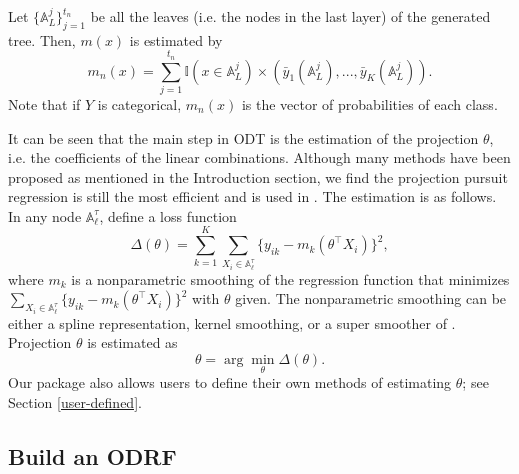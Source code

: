 Let $\{\mathbb{A}_L^j\}_{j=1}^{t_n}$ be all the leaves (i.e. the nodes in the last layer) of the generated tree. Then, $m(x)$ is estimated by
$$m_{n}(x)=\sum_{j=1}^{t_n}\mathbb{I}(x\in \mathbb{A}_L^j)\times  (\bar y_1(\mathbb{A}_L^j), ..., \bar y_K(\mathbb{A}_L^j)).$$
Note that if $ Y$ is categorical,  $ m_{n}(x) $ is the vector of  probabilities of each class.


It can be seen that the main step in  ODT  is the estimation of the projection $ \theta $, i.e. the coefficients of the linear combinations. Although many methods have been proposed as mentioned in the Introduction section, we find the projection pursuit regression \citep{friedman1981projection} is still the most efficient and is used in . The estimation is as follows. In any node $ \mathbb{A}_\ell^\tau $, define a loss function
$$
\Delta(\theta) =  \sum_{k=1}^K \sum_{X_i \in \mathbb{A}_\ell^\tau} \Big\{y_{ik} - m_k(\theta^\top X_i)\Big\}^2,
$$
where  $ m_k $ is a nonparametric smoothing of the regression function that minimizes  $\sum_{X_i \in \mathbb{A}_\ell^\tau} \Big\{y_{ik} - m_k(\theta^\top X_i)\Big\}^2$ with $ \theta $ given. The nonparametric smoothing can be either a spline representation, kernel smoothing, or a super smoother of \citet{friedman1984variable}. Projection $ \theta $ is estimated as%
$$
\theta = \arg \min_\theta \Delta(\theta).
$$
Our package also allows users to define their own methods of estimating $ \theta $; see Section \ref{user-defined}. 

\subsection{Build an ODRF}\label{sec:ODRF}


